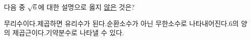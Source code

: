 다음 중 $\sqrt{6}$에 대한 설명으로 옳지 \underline{않은} 것은?
\begin{choicesv}{무리수이다.}{제곱하면 유리수가 된다.}{순환소수가 아닌 무한소수로 나타내어진다.}{$6$의 양의 제곱근이다.}{기약분수로 나타낼 수 있다.}\end{choicesv}
